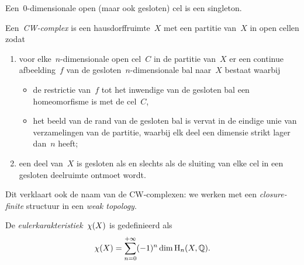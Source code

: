 \documentclass[a4paper,11pt,openany,oneside,article]{memoir}
\begin{document}
\begin{remark}
  Een~$0$\nobreakdash-dimensionale open (maar ook gesloten) cel is een singleton.
\end{remark}

\begin{definition}
  Een~\emph{CW\nobreakdash-complex} is een hausdorffruimte~$X$ met een partitie van~$X$ in open cellen zodat
  \begin{enumerate}
    \item voor elke~$n$\nobreakdash-dimensionale open cel~$C$ in de partitie van~$X$ er een continue afbeelding~$f$ van de gesloten~$n$\nobreakdash-dimensionale bal naar~$X$ bestaat waarbij
      \begin{itemize}
        \item de restrictie van~$f$ tot het inwendige van de gesloten bal een homeomorfisme is met de cel~$C$,
        \item het beeld van de rand van de gesloten bal is vervat in de eindige unie van verzamelingen van de partitie, waarbij elk deel een dimensie strikt lager dan~$n$ heeft;
      \end{itemize}
    \item een deel van~$X$ is gesloten als en slechts als de sluiting van elke cel in een gesloten deelruimte ontmoet wordt.
  \end{enumerate}
\end{definition}



Dit verklaart ook de naam van de CW\nobreakdash-complexen: we werken met een \emph{closure-finite} structuur in een \emph{weak topology}.

\begin{definition}
  De \emph{eulerkarakteristiek}~$\chi(X)$ is gedefinieerd als
  \begin{equation}
    \chi(X)=\sum_{n=0}^{+\infty}(-1)^n\dim\mathrm{H}_n(X,\mathbb{Q}).
  \end{equation}
\end{definition}




\nocite{*}


\end{document}
